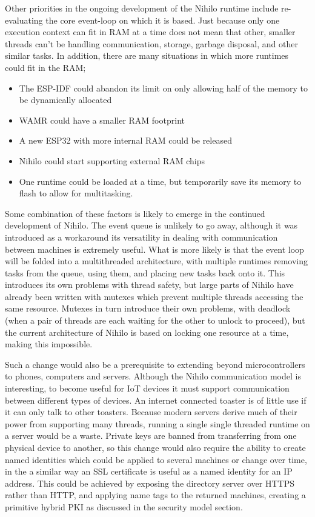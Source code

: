 \documentclass{article}
\begin{document}
Other priorities in the ongoing development of the Nihilo runtime include re-evaluating the core event-loop on which it is based. Just because only one execution context can fit in RAM at a time does not mean that other, smaller threads can't be handling communication, storage, garbage disposal, and other similar tasks. In addition, there are many situations in which more runtimes could fit in the RAM;
\begin{itemize}
\item The ESP-IDF could abandon its limit on only allowing half of the memory to be dynamically allocated
\item WAMR could have a smaller RAM footprint
\item A new ESP32 with more internal RAM could be released
\item Nihilo could start supporting external RAM chips
\item One runtime could be loaded at a time, but temporarily save its memory to flash to allow for multitasking.
\end{itemize}

Some combination of these factors is likely to emerge in the continued development of Nihilo. The event queue is unlikely to go away, although it was introduced as a workaround its versatility in dealing with communication between machines is extremely useful. What is more likely is that the event loop will be folded into a multithreaded architecture, with multiple runtimes removing tasks from the queue, using them, and placing new tasks back onto it. This introduces its own problems with thread safety, but large parts of Nihilo have already been written with mutexes which prevent multiple threads accessing the same resource. Mutexes in turn introduce their own problems, with deadlock (when a pair of threads are each waiting for the other to unlock to proceed), but the current architecture of Nihilo is based on locking one resource at a time, making this impossible.

Such a change would also be a prerequisite to extending beyond microcontrollers to phones, computers and servers. Although the Nihilo communication model is interesting, to become useful for IoT devices it must support communication between different types of devices. An internet connected toaster is of little use if it can only talk to other toasters. Because modern servers derive much of their power from supporting many threads, running a single single threaded runtime on a server would be a waste. Private keys are banned from transferring from one physical device to another, so this change would also require the ability to create named identities which could be applied to several machines or change over time, in  the a similar way an SSL certificate is useful as a named identity for an IP address. This could be achieved by exposing the directory server over HTTPS rather than HTTP, and applying name tags to the returned machines, creating a primitive hybrid PKI as discussed in the security model section.
\end{document}
